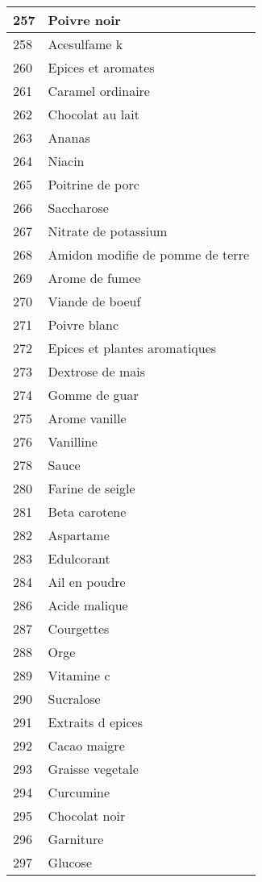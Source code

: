 \begin{longtable}{|l|l|}
257 & Poivre noir \\ \hline 
258 & Acesulfame k \\ \hline 
260 & Epices et aromates \\ \hline 
261 & Caramel ordinaire \\ \hline 
262 & Chocolat au lait \\ \hline 
263 & Ananas \\ \hline 
264 & Niacin \\ \hline 
265 & Poitrine de porc \\ \hline 
266 & Saccharose \\ \hline 
267 & Nitrate de potassium \\ \hline 
268 & Amidon modifie de pomme de terre \\ \hline 
269 & Arome de fumee \\ \hline 
270 & Viande de boeuf \\ \hline 
271 & Poivre blanc \\ \hline 
272 & Epices et plantes aromatiques \\ \hline 
273 & Dextrose de mais \\ \hline 
274 & Gomme de guar \\ \hline 
275 & Arome vanille \\ \hline 
276 & Vanilline \\ \hline 
278 & Sauce \\ \hline 
280 & Farine de seigle \\ \hline 
281 & Beta carotene \\ \hline 
282 & Aspartame \\ \hline 
283 & Edulcorant \\ \hline 
284 & Ail en poudre \\ \hline 
286 & Acide malique \\ \hline 
287 & Courgettes \\ \hline 
288 & Orge \\ \hline 
289 & Vitamine c \\ \hline 
290 & Sucralose \\ \hline 
291 & Extraits d epices \\ \hline 
292 & Cacao maigre \\ \hline 
293 & Graisse vegetale \\ \hline 
294 & Curcumine \\ \hline 
295 & Chocolat noir \\ \hline 
296 & Garniture \\ \hline 
297 & Glucose \\ \hline 

\end{longtable}
